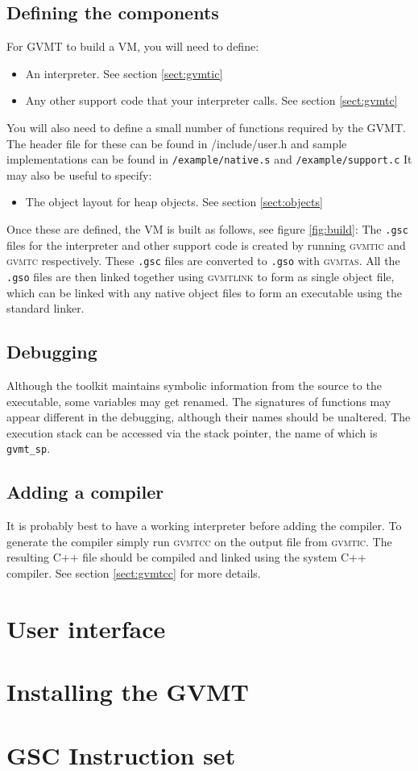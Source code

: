 \documentclass[a4paper,10pt]{report}
\newcommand{\gvmtic}{\textsc{gvmtic}}
\newcommand{\gvmtc}{\textsc{gvmtc}}
\newcommand{\glink}{\textsc{gvmtlink}}
\newcommand{\gvmtas}{\textsc{gvmtas}}
\newcommand{\gvmtcc}{\textsc{gvmtcc}}
\begin{document}
\section{Defining the components}
For GVMT to build a VM, you will need to define:
\begin{itemize}
\item An interpreter. See section \ref{sect:gvmtic}
\item Any other support code that your interpreter calls. See section \ref{sect:gvmtc}
\end{itemize}
You will also need to define a small number of functions required by the GVMT. The header file for these can be found in /include/user.h and sample implementations can be found in \verb|/example/native.s| and \verb|/example/support.c|
It may also be useful to specify:
\begin{itemize}
\item The object layout for heap objects. See section \ref{sect:objects}
\end{itemize}

Once these are defined, the VM is built as follows, see figure \ref{fig:build}: The \verb|.gsc| files for the interpreter and other support code is created by running \gvmtic{} and \gvmtc{} respectively. These  \verb|.gsc| files are converted to \verb|.gso| with \gvmtas. All the  \verb|.gso| files are then linked together using \glink{} to form as single object file, which can be linked with any native object files to form an executable using the standard linker.

\section{Debugging}
Although the toolkit maintains symbolic information from the source to the executable, some variables may get renamed. 
The signatures of functions may appear different in the debugging, although their names should be unaltered.
The execution stack can be accessed via the stack pointer, the name of which is \verb|gvmt_sp|.

\section{Adding a compiler}
It is probably best to have a working interpreter before adding the compiler. To generate the compiler simply run \gvmtcc{} on the output file from \gvmtic. The resulting C++ file should be compiled and linked using the system C++ compiler. See section \ref{sect:gvmtcc} for more details.

\chapter{User interface}


\appendix

\chapter{Installing the GVMT}



\chapter{GSC Instruction set\label{app:inst}}
\small


\end{document}
